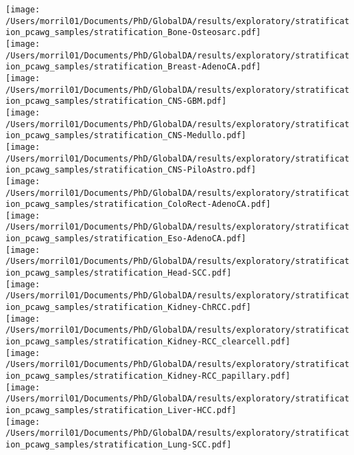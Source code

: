 \documentclass{article}
\begin{document}
\texttt{[image: /Users/morril01/Documents/PhD/GlobalDA/results/exploratory/stratification\_pcawg\_samples/stratification\_Bone-Osteosarc.pdf]}\\
\texttt{[image: /Users/morril01/Documents/PhD/GlobalDA/results/exploratory/stratification\_pcawg\_samples/stratification\_Breast-AdenoCA.pdf]}\\
\texttt{[image: /Users/morril01/Documents/PhD/GlobalDA/results/exploratory/stratification\_pcawg\_samples/stratification\_CNS-GBM.pdf]}\\
\texttt{[image: /Users/morril01/Documents/PhD/GlobalDA/results/exploratory/stratification\_pcawg\_samples/stratification\_CNS-Medullo.pdf]}\\
\texttt{[image: /Users/morril01/Documents/PhD/GlobalDA/results/exploratory/stratification\_pcawg\_samples/stratification\_CNS-PiloAstro.pdf]}\\
\texttt{[image: /Users/morril01/Documents/PhD/GlobalDA/results/exploratory/stratification\_pcawg\_samples/stratification\_ColoRect-AdenoCA.pdf]}\\
\texttt{[image: /Users/morril01/Documents/PhD/GlobalDA/results/exploratory/stratification\_pcawg\_samples/stratification\_Eso-AdenoCA.pdf]}\\
\texttt{[image: /Users/morril01/Documents/PhD/GlobalDA/results/exploratory/stratification\_pcawg\_samples/stratification\_Head-SCC.pdf]}\\
\texttt{[image: /Users/morril01/Documents/PhD/GlobalDA/results/exploratory/stratification\_pcawg\_samples/stratification\_Kidney-ChRCC.pdf]}\\
\texttt{[image: /Users/morril01/Documents/PhD/GlobalDA/results/exploratory/stratification\_pcawg\_samples/stratification\_Kidney-RCC\_clearcell.pdf]}\\
\texttt{[image: /Users/morril01/Documents/PhD/GlobalDA/results/exploratory/stratification\_pcawg\_samples/stratification\_Kidney-RCC\_papillary.pdf]}\\
\texttt{[image: /Users/morril01/Documents/PhD/GlobalDA/results/exploratory/stratification\_pcawg\_samples/stratification\_Liver-HCC.pdf]}\\
\texttt{[image: /Users/morril01/Documents/PhD/GlobalDA/results/exploratory/stratification\_pcawg\_samples/stratification\_Lung-SCC.pdf]}\\
\end{document}
